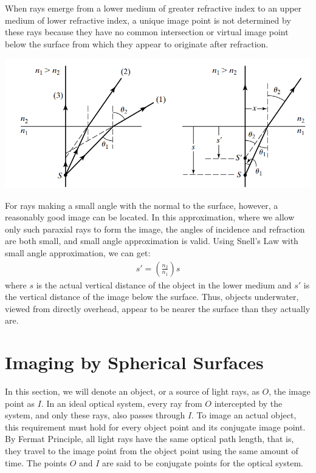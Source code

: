 \documentclass[11pt]{book}
\theoremstyle{break}
\theoremstyle{break}
\begin{document}
\hfill\break
When rays emerge from a lower medium of greater refractive index to an upper medium of lower refractive index, a unique image point is not determined by these rays because they have no common intersection or virtual image point below the surface from which they appear to originate after refraction. \\

\begin{center}
\includegraphics[scale=0.55]{refracIma.png}
\end{center}

For rays making a small angle with the normal to the surface, however, a reasonably good image can be located. In this approximation, where we allow only such paraxial rays to form the image, the angles of incidence and refraction are both small, and small angle approximation is valid. Using Snell's Law with small angle approximation, we can get:
\begin{align}
s' = \left(\frac{n_2}{n_1}\right)s
\end{align}
where $s$ is the actual vertical distance of the object in the lower medium and $s'$ is the vertical distance of the image below the surface. Thus, objects underwater,
viewed from directly overhead, appear to be nearer the surface than they actually are.


\newpage
\section[Imaging by Spherical Surfaces]{\color{red} Imaging by Spherical Surfaces\color{black}}
In this section, we will denote an object, or a source of light rays, as $O$, the image point as $I$. In an ideal optical system, every ray from $O$ intercepted by the system, and only these rays, also passes through $I$. To image an actual object, this requirement must hold for every object point and its conjugate image point. By Fermat Principle, all light rays have the same optical path length, that is, they travel to the image point from the object point using the same amount of time. The points $O$ and $I$ are said to be conjugate points for the optical system. \\
\end{document}
